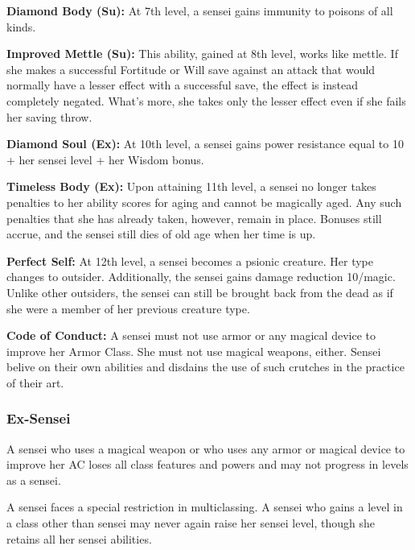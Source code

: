 {\textbf{Diamond Body (Su):} At 7th level, a sensei gains immunity to poisons of all kinds.

\textbf{Improved Mettle (Su):} This ability, gained at 8th level, works like mettle. If she makes a successful Fortitude or Will save against an attack that would normally have a lesser effect with a successful save, the effect is instead completely negated. What's more, she takes only the lesser effect even if she fails her saving throw.

\textbf{Diamond Soul (Ex):} At 10th level, a sensei gains power resistance equal to 10 + her sensei level + her Wisdom bonus.

\textbf{Timeless Body (Ex):} Upon attaining 11th level, a sensei no longer takes penalties to her ability scores for aging and cannot be magically aged. Any such penalties that she has already taken, however, remain in place. Bonuses still accrue, and the sensei still dies of old age when her time is up.

\textbf{Perfect Self:} At 12th level, a sensei becomes a psionic creature. Her type changes to outsider. Additionally, the sensei gains damage reduction 10/magic. Unlike other outsiders, the sensei can still be brought back from the dead as if she were a member of her previous creature type.

\textbf{Code of Conduct:} A sensei must not use armor or any magical device to improve her Armor Class. She must not use magical weapons, either. Sensei belive on their own abilities and disdains the use of such crutches in the practice of their art.

\subsubsection{Ex-Sensei}
A sensei who uses a magical weapon or who uses any armor or magical device to improve her AC loses all class features and powers and may not progress in levels as a sensei. %

A sensei faces a special restriction in multiclassing. A sensei who gains a level in a class other than sensei may never again raise her sensei level, though she retains all her sensei abilities.
}